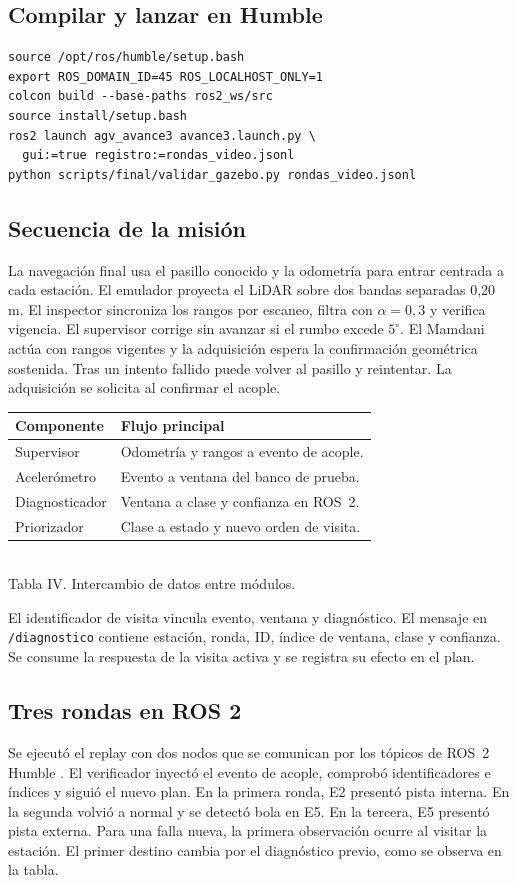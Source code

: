 \documentclass[conference,letterpaper]{IEEEtran}
\begin{document}
\subsection{Compilar y lanzar en Humble}
\begin{lstlisting}
source /opt/ros/humble/setup.bash
export ROS_DOMAIN_ID=45 ROS_LOCALHOST_ONLY=1
colcon build --base-paths ros2_ws/src
source install/setup.bash
ros2 launch agv_avance3 avance3.launch.py \
  gui:=true registro:=rondas_video.jsonl
python scripts/final/validar_gazebo.py rondas_video.jsonl
\end{lstlisting}
\subsection{Secuencia de la misión}
La navegación final usa el pasillo conocido y la odometría para entrar centrada a cada estación. El emulador proyecta el LiDAR sobre dos bandas separadas 0,20 m. El inspector sincroniza los rangos por escaneo, filtra con $\alpha=0{,}3$ y verifica vigencia. El supervisor corrige sin avanzar si el rumbo excede $5^\circ$. El Mamdani actúa con rangos vigentes y la adquisición espera la confirmación geométrica sostenida. Tras un intento fallido puede volver al pasillo y reintentar. La adquisición se solicita al confirmar el acople.

\begin{center}
\small
\begin{tabular}{@{}p{2.2cm}p{5.4cm}@{}}
\toprule Componente & Flujo principal\\
\midrule Supervisor & Odometría y rangos a evento de acople.\\
Acelerómetro & Evento a ventana del banco de prueba.\\
Diagnosticador & Ventana a clase y confianza en ROS~2.\\
Priorizador & Clase a estado y nuevo orden de visita.\\
\bottomrule
\end{tabular}\\
Tabla IV. Intercambio de datos entre módulos.
\end{center}
El identificador de visita vincula evento, ventana y diagnóstico. El mensaje en \texttt{/diagnostico} contiene estación, ronda, ID, índice de ventana, clase y confianza. Se consume la respuesta de la visita activa y se registra su efecto en el plan.
\newpage
\subsection{Tres rondas en ROS 2}
Se ejecutó el replay con dos nodos que se comunican por los tópicos de ROS~2 Humble \cite{ros}. El verificador inyectó el evento de acople, comprobó identificadores e índices y siguió el nuevo plan. En la primera ronda, E2 presentó pista interna. En la segunda volvió a normal y se detectó bola en E5. En la tercera, E5 presentó pista externa. Para una falla nueva, la primera observación ocurre al visitar la estación. El primer destino cambia por el diagnóstico previo, como se observa en la tabla.
\end{document}
